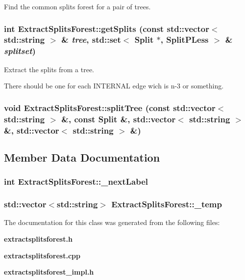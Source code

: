 Find the common splits forest for a pair of trees. 

\subsubsection{\setlength{\rightskip}{0pt plus 5cm}int Extract\-Splits\-Forest::get\-Splits (const std::vector$<$ std::string $>$ \& {\em tree}, std::set$<$ {\bf Split} $\ast$, {\bf Split\-PLess} $>$ \& {\em splitset})\hspace{0.3cm}{\tt  [protected]}}\label{classExtractSplitsForest_b0}


Extract the splits from a tree. 

There should be one for each INTERNAL edge wich is n-3 or something. 
\subsubsection{\setlength{\rightskip}{0pt plus 5cm}void Extract\-Splits\-Forest::split\-Tree (const std::vector$<$ std::string $>$ \&, const {\bf Split} \&, std::vector$<$ std::string $>$ \&, std::vector$<$ std::string $>$ \&)\hspace{0.3cm}{\tt  [protected]}}\label{classExtractSplitsForest_b2}




\subsection{Member Data Documentation}
\subsubsection{\setlength{\rightskip}{0pt plus 5cm}int {\bf Extract\-Splits\-Forest::\_\-next\-Label}\hspace{0.3cm}{\tt  [protected]}}\label{classExtractSplitsForest_p1}


\subsubsection{\setlength{\rightskip}{0pt plus 5cm}std::vector$<$std::string$>$ {\bf Extract\-Splits\-Forest::\_\-temp}\hspace{0.3cm}{\tt  [protected]}}\label{classExtractSplitsForest_p0}




The documentation for this class was generated from the following files:\begin{CompactItemize}
\item 
{\bf extractsplitsforest.h}\item 
{\bf extractsplitsforest.cpp}\item 
{\bf extractsplitsforest\_\-impl.h}\end{CompactItemize}
